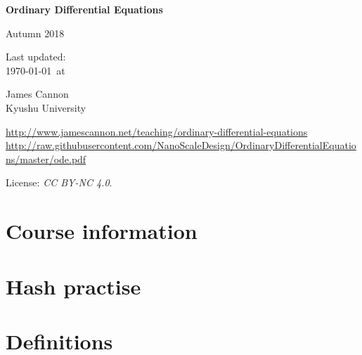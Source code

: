 \documentclass[a4paper]{book} %
\newcommand{\courseyear}{2018 }
\newcommand{\courseurl}{ordinary-differential-equations}
\begin{document}
\begin{titlepage}
    \begin{center}
        \vspace*{1cm}

        \Huge
        \textbf{Ordinary Differential Equations}

        Autumn \courseyear

        \vspace{1.5cm}
        \Large
        Last updated:\\\today \ at \currenttime

        \vspace{4.0cm}
        \LARGE
        James Cannon\\Kyushu University
        \vfill

        \normalsize
        \url{http://www.jamescannon.net/teaching/\courseurl}\\
        \vspace{0.3cm}
        \small
        \url{http://raw.githubusercontent.com/NanoScaleDesign/OrdinaryDifferentialEquations/master/ode.pdf}
        \vspace{0.5cm}

        License: \emph{CC BY-NC 4.0}.

    \end{center}
\end{titlepage}

\setcounter{chapter}{-1}

\tableofcontents

\chapter{Course information}
\newpage



%


\chapter{Hash practise}

\chapter{Definitions}

\end{document}
